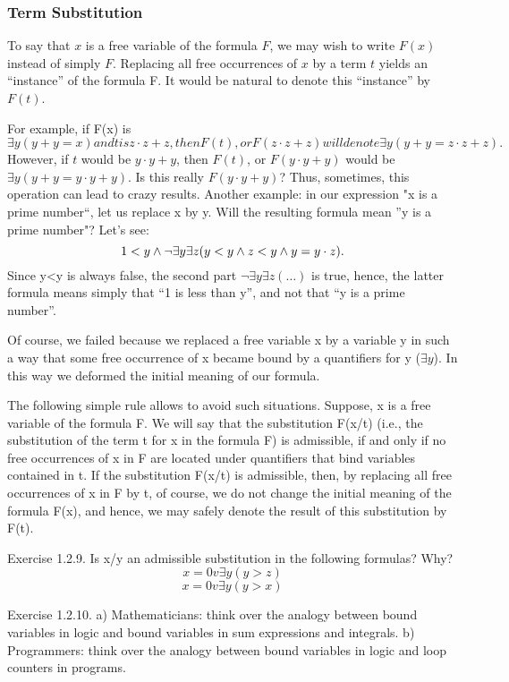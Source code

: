 \subsubsection{Term Substitution}

To say that \(x\) is a free variable of the formula \(F\), we may wish to write \(F(x)\) instead of simply \(F\). Replacing all free occurrences of \(x\) by a term \(t\) yields an ``instance'' of the formula F.
It would be natural to denote this ``instance'' by \(F(t)\).

For example, if F(x) is \(\exists y(y+y=x) and t is z\cdot z+z, then F(t), or F(z\cdot z+z) will denote \exists y(y+y=z\cdot z+z).\) However, if \(t\) would be \(y\cdot y+y\), then \(F(t)\), or \(F(y\cdot y+y)\) would be \(\exists y(y+y=y\cdot y+y)\).  Is this really \(F(y\cdot y+y)\)?  Thus, sometimes, this operation can lead to crazy results. Another example: in our expression "x is a prime number``, let us replace x by y. Will the resulting formula mean ''y is a prime number"? Let's see: \[1<y \wedge  \neg \exists y\exists z(y<y \wedge  z<y \wedge  y=y\cdot z).\] Since y<y is always false, the second part \(\neg \exists y\exists z(\ldots )\) is true, hence, the latter formula means simply that ``1 is less than y'', and not that ``y is a prime number''.

Of course, we failed because we replaced a free variable x by a variable y in such a way that some free occurrence of x became bound by a quantifiers for y (\(\exists y\)). In this way we deformed the initial meaning of our formula.

The following simple rule allows to avoid such situations. Suppose, x is a free variable of the formula F.  We will say that the substitution F(x/t) (i.e., the substitution of the term t for x in the formula F) is admissible, if and only if no free occurrences of x in F are located under quantifiers that bind variables contained in t. If the substitution F(x/t) is admissible, then, by replacing all free occurrences of x in F by t, of course, we do not change the initial meaning of the formula F(x), and hence, we may safely denote the result of this substitution by F(t).

Exercise 1.2.9. Is x/y an admissible substitution in the following formulas? Why?
\[x=0 v \exists y(y>z)\]
\[x=0 v \exists y(y>x)\]

Exercise 1.2.10. a) Mathematicians: think over the analogy between bound variables in logic and bound
variables in sum expressions and integrals.
b) Programmers: think over the analogy between bound variables in logic and loop counters in programs.

